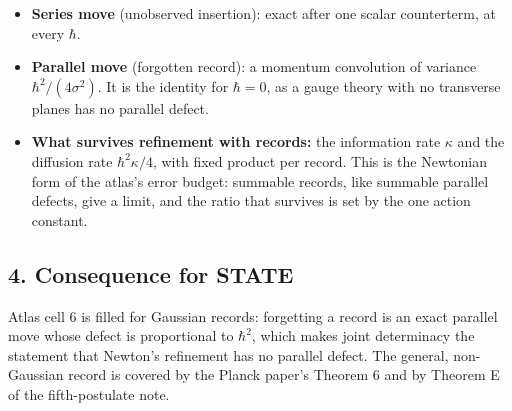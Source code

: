\documentclass[11pt,a4paper]{article}
\newcommand{\tightlist}{\setlength{\itemsep}{0pt}\setlength{\parskip}{0pt}}
\begin{document}
\begin{itemize}
\tightlist
\item
  \textbf{Series move} (unobserved insertion): exact after one scalar
  counterterm, at every \(\hbar\).
\item
  \textbf{Parallel move} (forgotten record): a momentum convolution of
  variance \(\hbar^2/(4\sigma^2)\). It is the identity for \(\hbar=0\),
  as a gauge theory with no transverse planes has no parallel defect.
\item
  \textbf{What survives refinement with records:} the information rate
  \(\kappa\) and the diffusion rate \(\hbar^2\kappa/4\), with fixed
  product per record. This is the Newtonian form of the atlas's error
  budget: summable records, like summable parallel defects, give a
  limit, and the ratio that survives is set by the one action constant.
\end{itemize}

\hypertarget{consequence-for-state}{%
\subsection{4. Consequence for STATE}\label{consequence-for-state}}

Atlas cell 6 is filled for Gaussian records: forgetting a record is an
exact parallel move whose defect is proportional to \(\hbar^2\), which
makes joint determinacy the statement that Newton's refinement has no
parallel defect. The general, non-Gaussian record is covered by the
Planck paper's Theorem 6 and by Theorem E of the fifth-postulate note.
\end{document}
